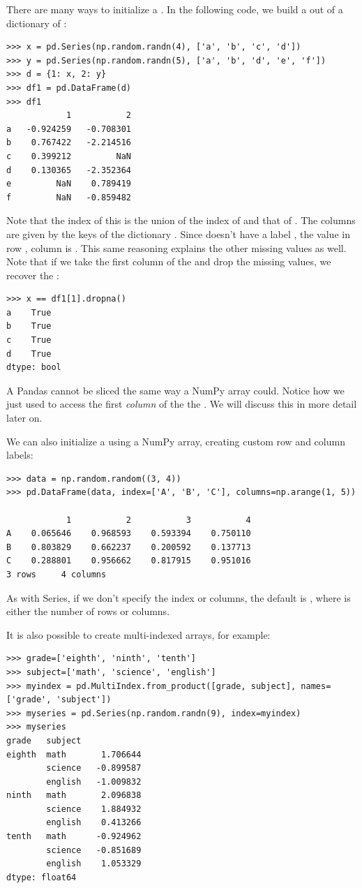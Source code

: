 There are many ways to initialize a . In the following code, we build a  out of a
dictionary of :
\begin{lstlisting}
>>> x = pd.Series(np.random.randn(4), ['a', 'b', 'c', 'd'])
>>> y = pd.Series(np.random.randn(5), ['a', 'b', 'd', 'e', 'f'])
>>> d = {1: x, 2: y}
>>> df1 = pd.DataFrame(d)
>>> df1
	        1	        2
a	-0.924259	-0.708301
b	 0.767422	-2.214516
c	 0.399212	      NaN
d	 0.130365	-2.352364
e	      NaN	 0.789419
f	      NaN	-0.859482
\end{lstlisting}
Note that the index of this  is the union of the index of   and that of  .
The columns are given by the keys of the dictionary . Since  doesn't have a label , the
value in row , column  is . This same reasoning explains the other missing values as well.
Note that if we take the first column of the  and drop the missing values, we recover the  :
\begin{lstlisting}
>>> x == df1[1].dropna()
a    True
b    True
c    True
d    True
dtype: bool
\end{lstlisting}

\begin{warn}
A Pandas  cannot be sliced the same way a NumPy array could.
Notice how we just used  to access the first \emph{column} of the
the  . We will discuss this in more detail later on.
\end{warn}

We can also initialize a  using a NumPy array, creating custom
row and column labels:
\begin{lstlisting}
>>> data = np.random.random((3, 4))
>>> pd.DataFrame(data, index=['A', 'B', 'C'], columns=np.arange(1, 5))

            1	        2	        3	        4
A	 0.065646	 0.968593	 0.593394	 0.750110
B	 0.803829	 0.662237	 0.200592	 0.137713
C	 0.288801	 0.956662	 0.817915	 0.951016
3 rows     4 columns
\end{lstlisting}
As with Series, if we don't specify the index or columns, the default is
, where  is either the number of rows or columns.

It is also possible to create multi-indexed arrays, for example:
\begin{lstlisting}
>>> grade=['eighth', 'ninth', 'tenth']
>>> subject=['math', 'science', 'english']
>>> myindex = pd.MultiIndex.from_product([grade, subject], names=['grade', 'subject'])
>>> myseries = pd.Series(np.random.randn(9), index=myindex)
>>> myseries
grade   subject
eighth  math       1.706644
        science   -0.899587
        english   -1.009832
ninth   math       2.096838
        science    1.884932
        english    0.413266
tenth   math      -0.924962
        science   -0.851689
        english    1.053329
dtype: float64
\end{lstlisting}

